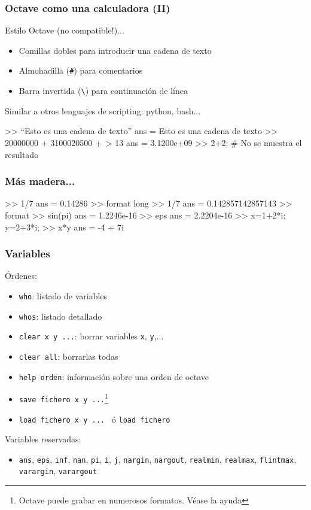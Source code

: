 \begin{frame}[containsverbatim]
\frametitle{Octave como una calculadora (II)}
Estilo Octave (no compatible!)...
\begin{itemize}
\item {} 
Comillas dobles para introducir una cadena de texto

\item {} 
Almohadilla (\verb|#|) para comentarios

\item {} 
Barra invertida (\verb|\|) para continuación de línea
\end{itemize}

Similar a otros lenguajes de scripting: python, bash...

\small
\begin{Octave}
>> ``Esto es una cadena de texto''
ans = Esto es una cadena de texto
>> 20000000 + 3100020500 +\
> 13
ans =  3.1200e+09
>> 2+2; # No se muestra el resultado
\end{Octave}

\end{frame}


\begin{frame}[containsverbatim]
\frametitle{Más madera...}
\small
\begin{Octave}
>> 1/7          %
ans =  0.14286
>> format long  %
>> 1/7 
ans =  0.142857142857143
>> format       %
>> sin(pi)      %
ans =  1.2246e-16
>> eps          %
ans =  2.2204e-16
>> x=1+2*i; y=2+3*i;  %
>>  x*y
ans = -4 + 7i
\end{Octave}
\end{frame}

\begin{frame}[containsverbatim]
\frametitle{Variables}
Órdenes:
\begin{itemize}
\item \verb|who|: listado de variables
\item \verb|whos|: listado detallado
\item \verb|clear x y ...|: borrar variables \verb|x|, \verb|y|,...
\item \verb|clear all|: borrarlas todas
\item \verb|help orden|: información sobre una orden de octave
\item \verb|save fichero x y ...|\footnote{Octave puede grabar en numerosos
    formatos. Véase la ayuda}
\item \verb|load fichero x y ... | ó \verb|load fichero|
\end{itemize}
Variables reservadas:
\begin{itemize}
\item \verb|ans|, \verb|eps|, \verb|inf|, \verb|nan|, \verb|pi|,
  \verb|i|, \verb|j|, \verb|nargin|, \verb|nargout|, \verb|realmin|,
  \verb|realmax|, \verb|flintmax|, \verb|varargin|, \verb|varargout|
\end{itemize}
\end{frame}

